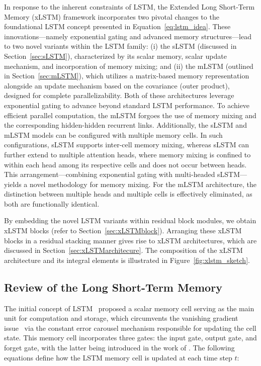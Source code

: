 In response to the inherent constraints of LSTM, the Extended Long Short-Term Memory (xLSTM) framework incorporates two pivotal changes to the foundational LSTM concept presented in Equation~\eqref{eq:lstm_idea}. These innovations—namely exponential gating and advanced memory structures—lead to two novel variants within the LSTM family: (i) the sLSTM (discussed in Section~\ref{sec:sLSTM}), characterized by its scalar memory, scalar update mechanism, and incorporation of memory mixing; and (ii) the mLSTM (outlined in Section~\ref{sec:mLSTM}), which utilizes a matrix-based memory representation alongside an update mechanism based on the covariance (outer product), designed for complete parallelizability. Both of these architectures leverage exponential gating to advance beyond standard LSTM performance. To achieve efficient parallel computation, the mLSTM forgoes the use of memory mixing and the corresponding hidden-hidden recurrent links. Additionally, the sLSTM and mLSTM models can be configured with multiple memory cells. In such configurations, sLSTM supports inter-cell memory mixing, whereas sLSTM can further extend to multiple attention heads, where memory mixing is confined to within each head among its respective cells and does not occur between heads. This arrangement—combining exponential gating with multi-headed sLSTM—yields a novel methodology for memory mixing. For the mLSTM architecture, the distinction between multiple heads and multiple cells is effectively eliminated, as both are functionally identical.

By embedding the novel LSTM variants within residual block modules, we obtain xLSTM blocks (refer to Section~\ref{sec:xLSTMblock}). Arranging these xLSTM blocks in a residual stacking manner gives rise to xLSTM architectures, which are discussed in Section~\ref{sec:xLSTMarchitecure}. The composition of the xLSTM architecture and its integral elements is illustrated in Figure~\ref{fig:xlstm_sketch}.

\subsection{Review of the Long Short-Term Memory}
\label{sec:orgLSTM}

The initial concept of LSTM~\citep{Hochreiter:91,Hochreiter:97nips,Hochreiter:97} proposed a scalar memory cell serving as the main unit for computation and storage, which circumvents the vanishing gradient issue~\citep{Hochreiter:91,Hochreiter:00book} via the constant error carousel mechanism responsible for updating the cell state. This memory cell incorporates three gates: the input gate, output gate, and forget gate, with the latter being introduced in the work of \citet{Gers:00}. The following equations define how the LSTM memory cell is updated at each time step $t$:

